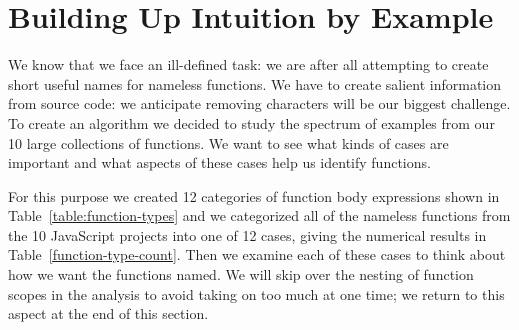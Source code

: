\documentclass[10pt, preprint]{sigplanconf}
\begin{document}
\section{Building Up Intuition by Example}
\label{sec:intuition}
We know that we face an ill-defined task: we are after all attempting to create short useful names for nameless functions. We have to create salient information from source code: we anticipate removing characters will be our biggest challenge.  To create an algorithm we decided to study the spectrum of examples from our 10 large collections of functions. We want to see what kinds of cases are important and what aspects of these cases help us identify functions.

For this purpose we created 12 categories of function body expressions shown in Table~\ref{table:function-types} and we categorized all of the nameless functions from the 10 JavaScript projects into one of 12 cases, giving the numerical results in Table~\ref{function-type-count}.  Then we examine each of these cases to think about how we want the functions named. We will skip over the nesting of function scopes in the analysis to avoid taking on too much at one time; we return to this aspect at the end of this section.
\end{document}
